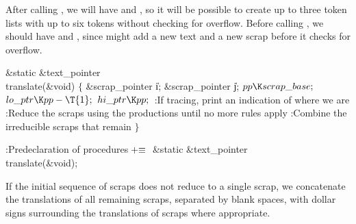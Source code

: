 After calling , we will have  and
, so it will be possible to create up
to three token
lists with up to six tokens without checking for overflow. Before calling
, we should have  and %
,
since  might add a new text and a new scrap before it checks
for overflow.

\Y\B\1\1\&{static} \&{text\_pointer} \\{translate}(\&{void})\2\2\6
${}\{{}$\1\6
\&{scrap\_pointer} \|i;\6
\&{scrap\_pointer} \|j;\7
${}\\{pp}\K\\{scrap\_base};{}$\6
${}\\{lo\_ptr}\K\\{pp}-\T{1};{}$\6
${}\\{hi\_ptr}\K\\{pp};{}$\6
:If tracing, print an indication of where we are\X\6
:Reduce the scraps using the productions until no more rules apply\X\6
:Combine the irreducible scraps that remain\X\6
\4${}\}{}$\2\par
\fi

\B{}:Predeclaration of procedures\X${}\mathrel+\equiv{}$\5
\&{static} \&{text\_pointer} \\{translate}(\&{void});\par
\fi

If the initial sequence of scraps does not reduce to a single scrap,
we concatenate the translations of all remaining scraps, separated by
blank spaces, with dollar signs surrounding the translations of scraps
where appropriate.

